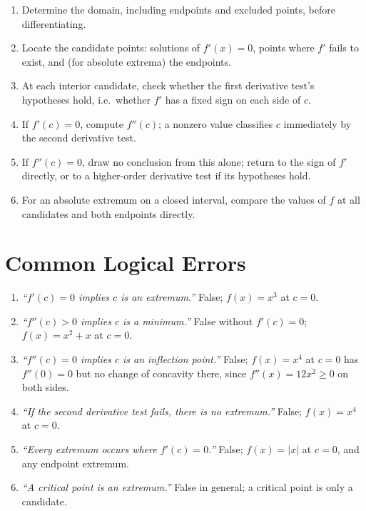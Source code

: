 \documentclass{essay}
\begin{document}
\begin{enumerate}
    \item Determine the domain, including endpoints and excluded points,
    before differentiating.
    \item Locate the candidate points: solutions of \(f'(x)=0\), points
    where \(f'\) fails to exist, and (for absolute extrema) the endpoints.
    \item At each interior candidate, check whether the first derivative
    test's hypotheses hold, i.e.\ whether \(f'\) has a fixed sign on each
    side of \(c\).
    \item If \(f'(c)=0\), compute \(f''(c)\); a nonzero value classifies
    \(c\) immediately by the second derivative test.
    \item If \(f''(c)=0\), draw no conclusion from this alone; return to
    the sign of \(f'\) directly, or to a higher-order derivative test if
    its hypotheses hold.
    \item For an absolute extremum on a closed interval, compare the
    values of \(f\) at all candidates and both endpoints directly.
\end{enumerate}

\section{Common Logical Errors}

\begin{enumerate}
    \item \emph{``\(f'(c)=0\) implies \(c\) is an extremum.''} False;
    \(f(x)=x^3\) at \(c=0\).
    \item \emph{``\(f''(c)>0\) implies \(c\) is a minimum.''} False without
    \(f'(c)=0\); \(f(x)=x^2+x\) at \(c=0\).
    \item \emph{``\(f''(c)=0\) implies \(c\) is an inflection point.''}
    False; \(f(x)=x^4\) at \(c=0\) has \(f''(0)=0\) but no change of
    concavity there, since \(f''(x)=12x^2\geq0\) on both sides.
    \item \emph{``If the second derivative test fails, there is no
    extremum.''} False; \(f(x)=x^4\) at \(c=0\).
    \item \emph{``Every extremum occurs where \(f'(c)=0\).''} False;
    \(f(x)=|x|\) at \(c=0\), and any endpoint extremum.
    \item \emph{``A critical point is an extremum.''} False in general; a
    critical point is only a candidate.
\end{enumerate}
\end{document}
